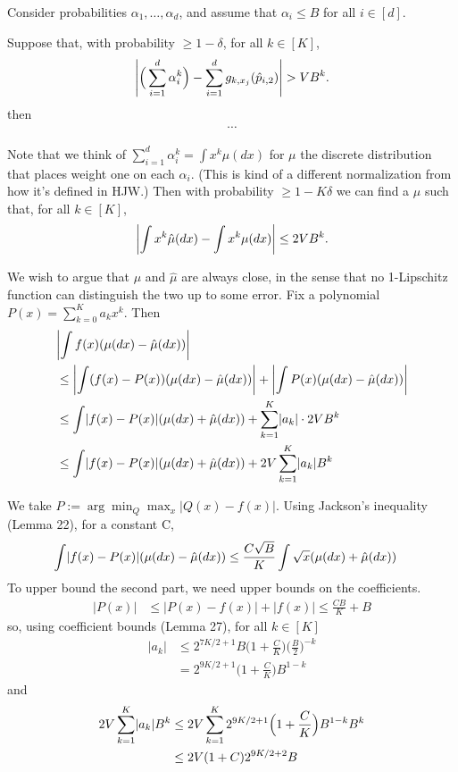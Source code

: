 \documentclass{article}
\theoremstyle{definition}
\DeclarePairedDelimiter{\abs}{\lvert}{\rvert}
\begin{document}
Consider probabilities $\alpha_1,\ldots,\alpha_d$, and assume that $\alpha_i \leq B$ for all $i \in [d]$.

\begin{theorem}
Suppose that, with probability $\geq 1-\delta$, for all $k \in [K]$,
\begin{align*}
    \abs*{\Big(\sum_{i=1}^d \alpha_i^k\Big) - \sum_{i=1}^d g_{k,x_j}(\hat{p}_{i,2})} > VB^k.
\end{align*}
then
\begin{align*}
    \cdots
\end{align*}
\end{theorem}

Note that we think of $\sum_{i=1}^d \alpha_i^k = \int x^k \mu(dx)$ for $\mu$ the discrete distribution that places weight one on each $\alpha_i$.
(This is kind of a different normalization from how it's defined in HJW.)
Then with probability $\geq 1-K\delta$ we can find a $\hat{\mu}$ such that, for all $k \in [K]$,
\begin{align*}
    \abs*{\int x^k\hat{\mu}(dx) - \int x^k \mu(dx)} \leq 2VB^k.
\end{align*}

We wish to argue that $\mu$ and $\hat{\mu}$ are always close, in the sense that no 1-Lipschitz function can distinguish the two up to some error.
Fix a polynomial $P(x) = \sum_{k=0}^K a_kx^k$.
Then
\begin{align*}
    &\abs*{\int f(x)(\mu(dx) - \hat{\mu}(dx))} \\
    & \leq \abs*{\int (f(x) - P(x))(\mu(dx) - \hat{\mu}(dx))} + \abs*{\int P(x)(\mu(dx) - \hat{\mu}(dx))} \\
    & \leq \int \abs{f(x) - P(x)}(\mu(dx) + \hat{\mu}(dx)) + \sum_{k=1}^K \abs{a_k}\cdot 2 VB^k \\
    & \leq \int \abs{f(x) - P(x)}(\mu(dx) + \hat{\mu}(dx)) + 2V \sum_{k=1}^K \abs{a_k}B^k
\end{align*}

We take $P := \arg\min_Q \max_x |Q(x) - f(x)|$.
Using Jackson's inequality (Lemma 22), for a constant C,
\begin{align*}
    \int \abs{f(x) - P(x)}(\mu(dx) - \hat{\mu}(dx))
    & \leq \frac{C\sqrt{B}}{K}\int \sqrt{x}(\mu(dx) + \hat{\mu}(dx))
\end{align*}
To upper bound the second part, we need upper bounds on the coefficients.
\begin{align*}
    |P(x)| &\leq |P(x) - f(x)| + |f(x)|
    \leq \frac{CB}{K} + B
\end{align*}
so, using coefficient bounds (Lemma 27), for all $k \in [K]$
\begin{align*}
    |a_k| &\leq 2^{7K/2 + 1}B\Big(1 + \frac CK\Big)\Big(\frac{B}{2}\Big)^{-k} \\
    &= 2^{9K/2 + 1}\Big(1 + \frac CK\Big)B^{1-k}
\end{align*}
and
\begin{align*}
    2V\sum_{k=1}^K \abs{a_k}B^k
    &\leq 2V\sum_{k=1}^K 2^{9K/2 + 1}\Big(1 + \frac CK\Big)B^{1-k}B^k \\
    &\leq 2V(1+C)2^{9K/2 + 2}B
\end{align*}
\end{document}
